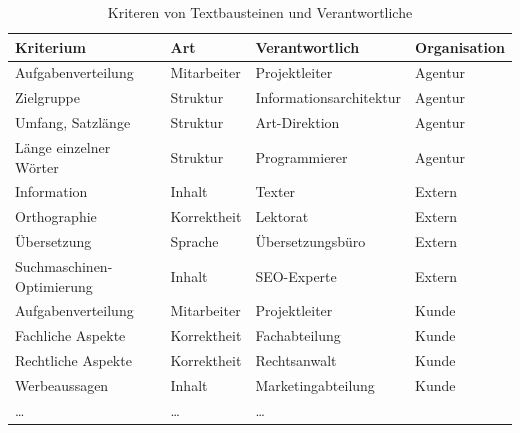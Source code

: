 \begin{table}
\begin{center}
\begin{tabular}{@{}l l l l}
\textbf{Kriterium} & \textbf{Art} & \textbf{Verantwortlich} & \textbf{Organisation}\\
\hline
Aufgabenverteilung & Mitarbeiter & Projektleiter & Agentur\\
\hline
Zielgruppe & Struktur & Informationsarchitektur & Agentur\\
\hline
Umfang, Satzlänge & Struktur & Art-Direktion & Agentur\\
\hline
Länge einzelner Wörter & Struktur & Programmierer & Agentur\\
\hline
Information & Inhalt & Texter & Extern\\
\hline
Orthographie & Korrektheit & Lektorat & Extern\\
\hline
Übersetzung & Sprache & Übersetzungsbüro & Extern\\
\hline
Suchmaschinen-Optimierung & Inhalt & SEO-Experte & Extern\\
\hline
Aufgabenverteilung & Mitarbeiter & Projektleiter & Kunde\\
\hline
Fachliche Aspekte & Korrektheit & Fachabteilung & Kunde\\
\hline
Rechtliche Aspekte & Korrektheit & Rechtsanwalt & Kunde\\
\hline
Werbeaussagen & Inhalt & Marketingabteilung & Kunde\\
\hline
… & … & …
\end{tabular}
\caption{Kriteren von Textbausteinen und Verantwortliche}
\label{table:textkriterien}
\end{center}
\end{table}

